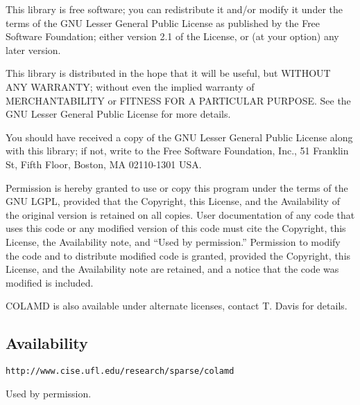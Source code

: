 \begin{footnotesize}
This library is free software; you can redistribute it and/or
modify it under the terms of the GNU Lesser General Public License
as published by the Free Software Foundation; either version 2.1 of
the License, or (at your option) any later version.

This library is distributed in the hope that it will be useful,
but WITHOUT ANY WARRANTY; without even the implied warranty of
MERCHANTABILITY or FITNESS FOR A PARTICULAR PURPOSE.  See the GNU
Lesser General Public License for more details.

You should have received a copy of the GNU Lesser General Public
License along with this library; if not, write to the Free Software
Foundation, Inc., 51 Franklin St, Fifth Floor, Boston, MA 02110-1301
USA.

Permission is hereby granted to use or copy this program under the
terms of the GNU LGPL, provided that the Copyright, this License,
and the Availability of the original version is retained on all
copies.  User documentation of any code that uses this code or any
modified version of this code must cite the Copyright, this License,
the Availability note, and ``Used by permission.''  Permission to
modify the code and to distribute modified code is granted, provided
the Copyright, this License, and the Availability note are retained,
and a notice that the code was modified is included.

COLAMD is also available under alternate licenses, contact T. Davis for
details.

\subsection*{Availability}

\verb|http://www.cise.ufl.edu/research/sparse/colamd|

\bigskip

\noindent
Used by permission.

\end{footnotesize}

